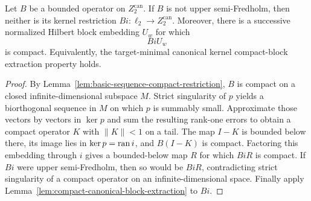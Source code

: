 \begin{lemma}
\label{lem:corrected-cgp-upper-restriction}
Let $B$ be a bounded operator on $Z_2^{\mathrm{can}}$.  If $B$ is not upper
semi-Fredholm, then neither is its kernel restriction $Bi:\ell_2\to Z_2^{\mathrm{can}}$.
Moreover, there is a successive normalized Hilbert block embedding $U_w$ for which
\[
  BiU_w
\]
is compact.  Equivalently, the target-minimal canonical kernel compact-block extraction
property holds.
\leanok
\end{lemma}

\begin{proof}
By Lemma~\ref{lem:basic-sequence-compact-restriction}, $B$ is compact on a closed
infinite-dimensional subspace $M$.  Strict singularity of $p$ yields a biorthogonal sequence in
$M$ on which $p$ is summably small.  Approximate those vectors by vectors in $\ker p$ and sum the
resulting rank-one errors to obtain a compact operator $K$ with $\lVert K\rVert<1$ on a tail.
The map $I-K$ is bounded below there, its image lies in $\ker p=\operatorname{ran} i$, and $B(I-K)$ is compact.
Factoring this embedding through $i$ gives a bounded-below map $R$ for which $BiR$ is compact.
If $Bi$ were upper semi-Fredholm, then so would be $BiR$, contradicting strict singularity of a
compact operator on an infinite-dimensional space.  Finally apply
Lemma~\ref{lem:compact-canonical-block-extraction} to $Bi$.
\end{proof}

